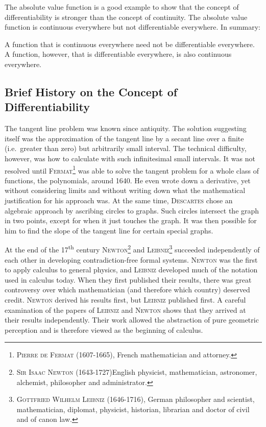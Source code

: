\documentclass[12pt,eng]{skript_ogg}
\begin{document}
The absolute value function is a good example to show that the concept of differentiability is stronger than the concept of continuity. The absolute value function is continuous everywhere but not differentiable everywhere. In summary:

\begin{satz} A function that is continuous everywhere need not be differentiable everywhere. A function, however, that is differentiable everywhere, is also continuous everywhere.
\end{satz}

\subsection{Brief History on the Concept of Differentiability}

The tangent line problem was known since antiquity. The solution suggesting itself was the approximation of the tangent line by a secant line over a finite (i.e.\ greater than zero) but arbitrarily small interval. The technical difficulty, however, was how to calculate with such infinitesimal small intervals. It was not resolved until \textsc{Fermat}\footnote{\textsc{Pierre de Fermat} (1607-1665), French mathematician and attorney.} was able to solve the tangent problem for a whole class of functions, the polynomials, around 1640. He even wrote down a derivative, yet without considering limits and without writing down what the mathematical justification for his approach was. At the same time, \textsc{Descartes} chose an algebraic approach by ascribing circles to graphs. Such circles intersect the graph in two points, except for when it just touches the graph. It was then possible for him to find the slope of the tangent line for certain special graphs.

At the end of the 17\textsuperscript{th} century \textsc{Newton}\footnote{\textsc{Sir Isaac Newton} (1643-1727)English physicist, mathematician, astronomer, alchemist, philosopher and administrator.} and \textsc{Leibniz}\footnote{\textsc{Gottfried Wilhelm Leibniz} (1646-1716), German philosopher and scientist, mathematician, diplomat, physicist, historian, librarian and doctor of civil and of canon law.} succeeded independently of each other in developing contradiction-free formal systems. \textsc{Newton} was the first to apply calculus to general physics, and \textsc{Leibniz} developed much of the notation used in calculus today. When they first published their results, there was great controversy over which mathematician (and therefore which country) deserved credit. \textsc{Newton} derived his results first, but \textsc{Leibniz} published first. A careful examination of the papers of \textsc{Leibniz} and \textsc{Newton} shows that they arrived at their results independently. Their work allowed the abstraction of pure geometric perception and is therefore viewed as the beginning of calculus. 
\end{document}
